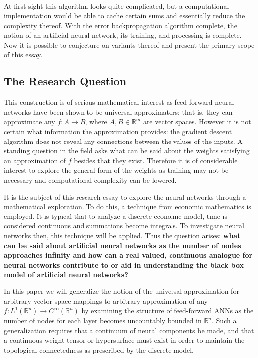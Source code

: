 \begin{equation}
\begin{aligned}
    \end{aligned}
\end{equation} At first sight this algorithm looks quite complicated, but a computational implementation would be able to cache certain sums and essentially reduce the complexity thereof. With the error backpropagation algorithm complete, the notion of an artificial neural network, its training, and processing is complete. Now it is possible to conjecture on variants thereof and present the primary scope of this essay.
\subsection{The Research Question}
This construction is of serious mathematical interest as feed-forward neural networks have been shown to be universal approximators; that is, they can approximate any \(f:A\to B\), where \(A,B \in \mathbb{R}^m\) are vector spaces. However it is not certain what information the approximation provides: the gradient descent algorithm does not reveal any connections between the values of the inputs.  A standing question in the field asks what can be said about the weights satisfying an approximation of $f$ besides that they exist. Therefore it is of considerable interest to explore the general form of the weights as training may not be necessary and computational complexity can be lowered.

It is the subject of this research essay to explore the neural networks through a mathematical exploration. To do this, a technique from economic mathematics is employed. It is typical that to analyze a discrete economic model, time is considered continuous and summations become integrals. To investigate neural networks then, this technique will be applied. Thus the question arises: \textbf{what can be said about artificial neural networks as the number of nodes approaches infinity and how can a real valued, continuous analogue for neural networks contribute to or aid in understanding the black box model of artificial neural networks?  }


In this paper we will generalize the notion of the universal approximation for arbitrary vector space mappings to arbitrary approximation of any \(f:L^1 (\mathbb{R}^n)\to C^\infty(\mathbb{R}^n)\) by examining the structure of feed-forward ANNs as the number of nodes for each layer becomes uncountably bounded in \(\mathbb{R}^n\). Such a generalization requires that a continuum of neural components be made, and that a continuous weight tensor or hypersurface must exist in order to maintain the topological connectedness as prescribed by the discrete model.